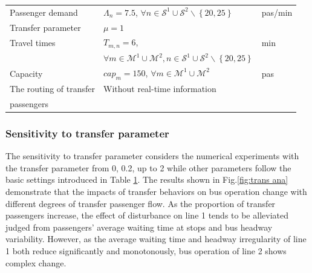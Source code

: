 \documentclass[smallextended]{svjour3}       %
\begin{document}
\begin{Abstract}
\begin{table}[H]
\begin{tabular}{p{3.4cm}p{6.5cm}p{1.1cm}}
      Passenger demand &$\Lambda_{n}=7.5$, $\forall n\in \mathcal{S}^{1}\cup\mathcal{S}^{2}\backslash\left\{20,25\right\}$&pas/min\\
      Transfer parameter & $\mu=1$&  \\
      Travel times & $T_{m,n}=6$,                            & min \\
                   &$\forall m\in\mathcal{M}^{1}\cup \mathcal{M}^{2},n\in \mathcal{S}^{1}\cup\mathcal{S}^{2}\backslash \left\{20,25\right\}$\\
      Capacity & $cap_m=150$, $\forall m\in\mathcal{M}^{1}\cup \mathcal{M}^{2}$&pas \\
      The routing of transfer & Without real-time information\\
      passengers
      &\\ \hline
  \end{tabular}
  \label{tab: basic settings}
\end{table}

\subsubsection{Sensitivity to transfer parameter}
The sensitivity to transfer parameter considers the numerical experiments with the transfer parameter from 0, 0.2, up to 2 
while other parameters follow the basic settings introduced in Table \ref{tab: basic settings}. 
The results shown in Fig.\ref{fig:trans ana} demonstrate that the impacts of transfer behaviors on bus operation change with different degrees of transfer passenger flow. 
As the proportion of transfer passengers increase, the effect of disturbance on line 1 tends to be alleviated judged from passengers' average waiting time at stops and bus headway variability.
However, as the average waiting time and headway irregularity of line 1 both reduce significantly and monotonously, 
bus operation of line 2 shows complex change. 


\end{Abstract}
\end{document}
